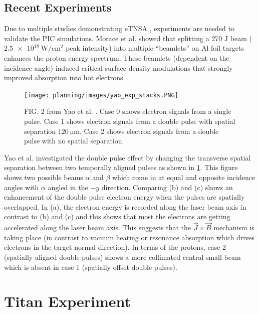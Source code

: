 
\subsection{Recent Experiments}

Due to multiple studies demonstrating \gls{eTNSA} \cite{Ferri_2019_Nat_Comm,Rahman_2021_PoP,Khan_2024_NJoP}, experiments are needed to validate the \gls{PIC} simulations. Morace et al. \cite{Morace_2019_Nat_Comm} showed that splitting a 270 J beam ($\SI{2.5e18}{\watt \per \centi \meter \squared}$ peak intensity) into multiple ``beamlets'' on Al foil targets enhances the proton energy spectrum. These beamlets (dependent on the incidence angle) induced critical surface density modulations that strongly improved absorption into hot electrons. 

\begin{figure}
	\centering 
	\texttt{[image: planning/images/yao\_exp\_stacks.PNG]}
	\caption{FIG. 2 from Yao et al. \cite{Yao_2024_MaRaE}. Case 0 shows electron signals from a single pulse. Case 1 shows electron signals from a double pulse with spatial separation $\SI{120}{\micro \meter}$. Case 2 shows electron signals from a double pulse with no spatial separation.}
	\label{fig:yao_exp_stacks}
\end{figure}

Yao et al. \cite{Yao_2024_MaRaE} investigated the double pulse effect by changing the transverse spatial separation between two temporally aligned pulses as shown in \cref{fig:yao_exp_stacks}. This figure shows two possible beams $\alpha$ and $\beta$ which come in at equal and opposite incidence angles with $\alpha$ angled in the $-y$ direction. Comparing (b) and (c) shows an enhancement of the double pulse electron energy when the pulses are spatially overlapped. In (a), the electron energy is recorded along the laser beam axis in contrast to (b) and (c) and this shows that most the electrons are getting accelerated along the laser beam axis. This suggests that the $\vec{J} \times \vec{B}$ mechanism is taking place (in contrast to vacuum heating or resonance absorption which drives electrons in the  target normal direction). In terms of the protons, case 2 (spatially aligned double pulses) shows a more collimated central small beam which is absent in case 1 (spatially offset double pulses).

\section{Titan Experiment}

